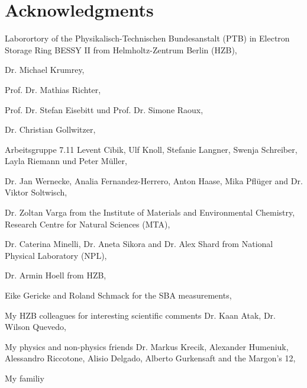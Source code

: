 \pagestyle{empty}
\noindent
\section*{Acknowledgments}

Laborortory of the Physikalisch-Technischen Bundesanstalt (PTB) in Electron Storage Ring BESSY II from Helmholtz-Zentrum Berlin (HZB),
\vspace{2ex}

\noindent Dr. Michael Krumrey,
\vspace{2ex}

\noindent Prof. Dr. Mathias Richter,
\vspace{2ex}

\noindent Prof. Dr. Stefan Eisebitt und Prof. Dr. Simone Raoux,
\vspace{2ex}

\noindent Dr. Christian Gollwitzer,
\vspace{2ex}

\noindent Arbeitsgruppe 7.11 Levent Cibik, Ulf Knoll, Stefanie Langner, Swenja Schreiber, Layla Riemann und Peter Müller,
\vspace{2ex}

\noindent Dr. Jan Wernecke, Analia Fernandez-Herrero, Anton Haase, Mika Pflüger and Dr. Viktor Soltwisch,
\vspace{2ex}

\noindent Dr. Zoltan Varga from the Institute of Materials and Environmental Chemistry, Research Centre for Natural Sciences (MTA),
\vspace{2ex}

\noindent Dr. Caterina Minelli, Dr. Aneta Sikora and Dr. Alex Shard from National Physical Laboratory (NPL),
\vspace{2ex}

\noindent Dr. Armin Hoell from HZB,
\vspace{2ex}

\noindent Eike Gericke and Roland Schmack for the SBA measurements,
\vspace{2ex}

\noindent My HZB colleagues for interesting scientific comments Dr. Kaan Atak, Dr. Wilson Quevedo,
\vspace{2ex}

\noindent My physics and non-physics friends Dr. Markus Krecik, Alexander Humeniuk, Alessandro Riccotone, Alisio Delgado, Alberto Gurkensaft and the Margon's 12,
\vspace{2ex}

\noindent My familiy


\cleardoublepage
